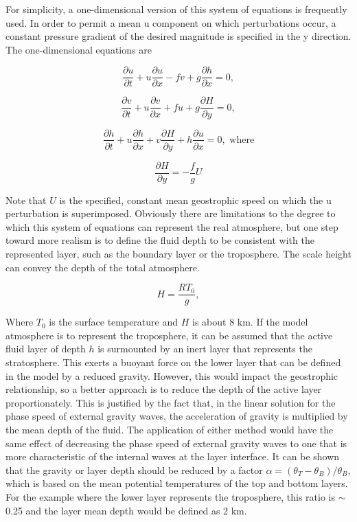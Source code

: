 \documentclass{article}
\begin{document}
For simplicity,  a one-dimensional version of this system of equations is frequently used. In order to permit a mean u component on which perturbations occur, a constant pressure gradient of the desired magnitude is specified in the y direction. The one-dimensional equations are

\begin{equation}
\frac{\partial u}{\partial t} + u\frac{\partial u}{\partial x} - fv + g\frac{\partial h}{\partial x} = 0,
\label{eq:53}
\end{equation}

\begin{equation}
\frac{\partial v}{\partial t} + u\frac{\partial v}{\partial x} + fu + g\frac{\partial H}{\partial y} = 0,
\label{eq:54}
\end{equation}

\begin{equation}
\frac{\partial h}{\partial t} + u\frac{\partial h}{\partial x} + v\frac{\partial H}{\partial y} + h\frac{\partial u}{\partial x} = 0, \text{ where}
\label{eq:55}
\end{equation}

\begin{equation}
\frac{\partial H}{\partial y} = -\frac{f}{g}U
\label{eq:56}
\end{equation}

Note that  $U$ is the specified, constant mean geostrophic speed on which the u perturbation is superimposed. Obviously there are limitations to the degree to which this system of equations can represent the real atmosphere, but one step toward more realism is to define the fluid depth to be consistent with the represented layer, such as the boundary layer or the troposphere. The scale height can convey the depth of the total atmosphere.

\begin{equation}
H = \frac{RT_0}{g},
\label{eq:57}
\end{equation}

Where $T_0$ is the surface temperature and $H$ is about 8 km. If the model atmosphere is to represent the troposphere, it can be assumed that the active fluid layer of depth $h$ is surmounted by an inert layer that represents the stratosphere. This exerts a buoyant force on the lower layer that can be defined in the model by a reduced gravity. However, this would impact the geostrophic relationship, so a better approach is to reduce the depth of the active layer proportionately. This is justified by the fact that, in the linear solution for the phase speed of external gravity waves, the acceleration of gravity is multiplied by the mean depth of the fluid. The application of either method would have the same effect of decreasing the phase speed of external gravity waves to one that is more characteristic of the internal waves at the layer interface. It can be shown that the gravity or layer depth should be reduced by a factor $\alpha = (\theta_T - \theta_B)/\theta_B$, which is based on the mean potential temperatures of the top and bottom layers. For the example where the lower layer represents the troposphere, this ratio is $\sim$0.25 and the layer mean depth would be defined as 2 km.
\end{document}
